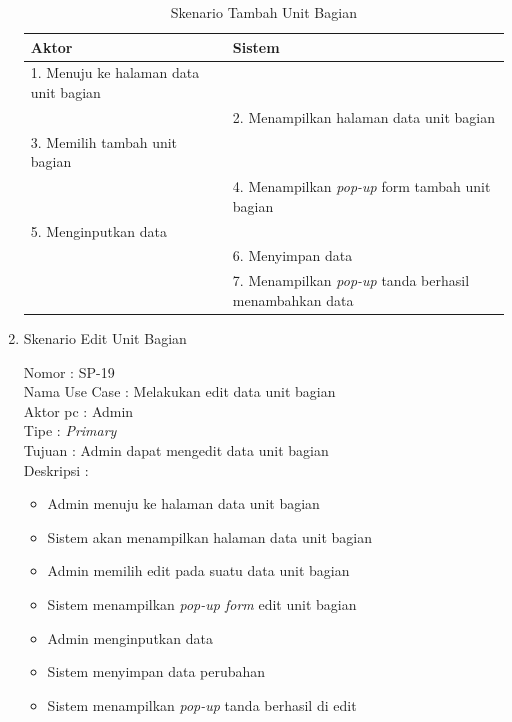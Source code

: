 \begin{enumerate}
\begin{table}
	\caption{Skenario Tambah Unit Bagian}
	\centering
	\begin{tabular}{ | p{55mm} | p{73mm} |}
		\hline 
		\textbf{Aktor} & \textbf{Sistem} \\
		\hline
		
		1.	Menuju ke halaman data unit bagian &  \\
		
		\hline
		
		&  2.	Menampilkan halaman data unit bagian \\
		
		\hline
		
		3. Memilih tambah unit bagian & \\
		
		\hline
		
		& 4.	Menampilkan\textit{ pop-up} form tambah unit bagian \\
		
		\hline
		
		5.	Menginputkan data  & \\
		\hline
		
		& 6.	Menyimpan data \\
		\hline
		
		& 7.	Menampilkan \textit{pop-up} tanda berhasil menambahkan data \\
		\hline
		
	\end{tabular}
\end{table}

\item Skenario Edit Unit Bagian

Nomor \kern 3.6pc : SP-19 \\
Nama Use Case : Melakukan edit data unit bagian \\
Aktor  pc : Admin \\
Tipe \kern 4.6pc : \textit{Primary} \\
Tujuan \kern 3.6pc : Admin dapat mengedit data unit bagian \\
Deskripsi \kern 2.5pc : 

\begin{itemize}
	\item Admin menuju ke halaman data unit bagian
	\item Sistem akan menampilkan halaman data unit bagian
	\item Admin memilih edit pada suatu data unit bagian
	\item Sistem menampilkan \textit{pop-up form} edit unit bagian
	\item Admin menginputkan data
	\item Sistem menyimpan data perubahan
	\item Sistem menampilkan \textit{pop-up} tanda berhasil di edit
	

\end{itemize}
\end{enumerate}
